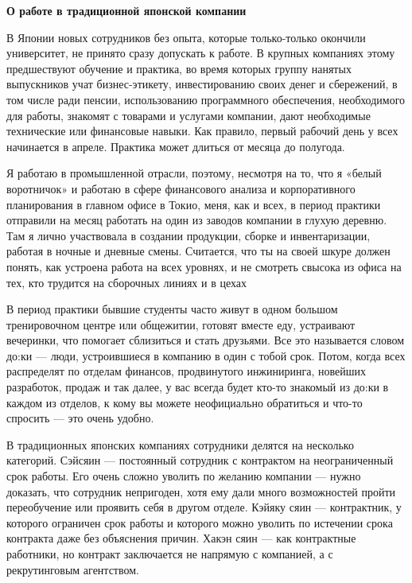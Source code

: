 \textbf{О работе в традиционной японской компании}

В Японии новых сотрудников без опыта, которые только-только окончили университет, не принято сразу допускать к работе. В крупных компаниях этому предшествуют обучение и практика, во время которых группу нанятых выпускников учат бизнес-этикету, инвестированию своих денег и сбережений, в том числе ради пенсии, использованию программного обеспечения, необходимого для работы, знакомят с товарами и услугами компании, дают необходимые технические или финансовые навыки. Как правило, первый рабочий день у всех начинается в апреле. Практика может длиться от месяца до полугода.

\begin{fancyquotes}
    Я работаю в промышленной отрасли, поэтому, несмотря на то, что я «белый воротничок» и работаю в сфере финансового анализа и корпоративного планирования в главном офисе в Токио, меня, как и всех, в период практики отправили на месяц работать на один из заводов компании в глухую деревню. Там я лично участвовала в создании продукции, сборке и инвентаризации, работая в ночные и дневные смены. Считается, что ты на своей шкуре должен понять, как устроена работа на всех уровнях, и не смотреть свысока из офиса на тех, кто трудится на сборочных линиях и в цехах
\end{fancyquotes}

В период практики бывшие студенты часто живут в одном большом тренировочном центре или общежитии, готовят вместе еду, устраивают вечеринки, что помогает сблизиться и стать друзьями. Все это называется словом до:ки — люди, устроившиеся в компанию в один с тобой срок. Потом, когда всех распределят по отделам финансов, продвинутого инжиниринга, новейших разработок, продаж и так далее, у вас всегда будет кто-то знакомый из до:ки в каждом из отделов, к кому вы можете неофициально обратиться и что-то спросить — это очень удобно.

В традиционных японских компаниях сотрудники делятся на несколько категорий. Сэйсяин — постоянный сотрудник с контрактом на неограниченный срок работы. Его очень сложно уволить по желанию компании — нужно доказать, что сотрудник непригоден, хотя ему дали много возможностей пройти переобучение или проявить себя в другом отделе. Кэйяку сяин — контрактник, у которого ограничен срок работы и которого можно уволить по истечении срока контракта даже без объяснения причин. Хакэн сяин — как контрактные работники, но контракт заключается не напрямую с компанией, а с рекрутинговым агентством.

